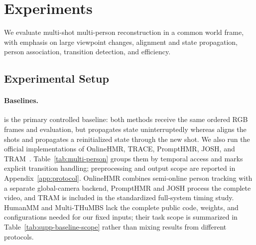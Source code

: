 \FloatBarrier
\section{Experiments}
\label{sec:experiments}

We evaluate multi-shot multi-person reconstruction in a common world frame,
with emphasis on large viewpoint changes, alignment and state propagation,
person association, transition detection, and efficiency.



\subsection{Experimental Setup}

\paragraph{Baselines.}
\humanthree{} is the primary controlled baseline: both methods receive the
same ordered RGB frames and evaluation, but \humanthree{} propagates state
uninterruptedly whereas \method{} aligns the shots and propagates a reinitialized
state through the new shot. We also run the official implementations of OnlineHMR, TRACE, PromptHMR,
JOSH, and TRAM~\citep{zhao2026onlinehmr,sun2023trace,wang2025prompthmr,liu2026josh,wang2024tram}.
Table~\ref{tab:multi-person} groups them by temporal access and marks explicit
transition handling; preprocessing and output scope are reported in
Appendix~\ref{app:protocol}. OnlineHMR combines semi-online person tracking
with a separate global-camera backend, PromptHMR and JOSH process the complete
video, and TRAM is included in the standardized full-system timing study.
HumanMM and Multi-THuMBS lack the complete
public code, weights, and configurations needed for our fixed inputs; their
task scope is summarized in Table~\ref{tab:supp-baseline-scope} rather
than mixing results from different protocols.

